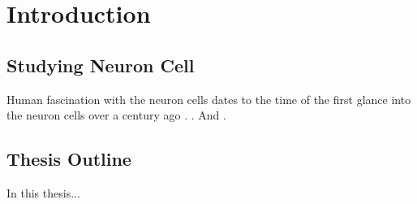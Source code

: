 %
%
\chpos{22mm}{10mm}
\chapter[Introduction]{Introduction}
\label{ch1:introduction}



\section{Studying Neuron Cell} 
Human fascination with the neuron cells dates to the time of the first glance into the neuron cells over a century ago \cite{ramon2008histologia}.  \cite{abramoff2004image}. And \cite{ascolitrees}.


\section{Thesis Outline}
In this thesis... 
